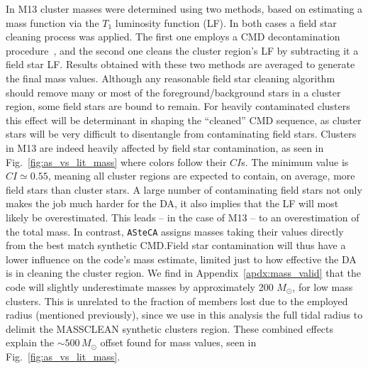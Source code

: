 \documentclass{aa}
\begin{document}
In M13 cluster masses were determined using two methods, based on estimating
a mass function via the $T_1$ luminosity function (LF).
In both cases a field star cleaning process was applied. The first one employs
a CMD decontamination procedure~\citep{Maia_2010}, and the
second one cleans the cluster region's LF by subtracting it a field star LF.\@
Results obtained with these two methods are averaged to generate the final
mass values.
%
Although any reasonable field star cleaning algorithm should remove many or most
of the foreground/background stars in a cluster region, some field stars are
bound to remain. For heavily contaminated clusters this effect will be
determinant in shaping the ``cleaned'' CMD sequence, as cluster stars will be
very difficult to disentangle from contaminating field stars.
%
Clusters in M13 are indeed heavily affected by field star contamination,
as seen in Fig.~\ref{fig:as_vs_lit_mass} where colors follow their $CI$s.
The minimum value is $CI{\simeq}0.55$, meaning all cluster regions are expected
to contain, on average, more field stars than cluster stars.
%
A large number of contaminating field stars not only makes the job much harder
for the DA, it also implies that the LF will most likely be overestimated. This
leads -- in the case of M13 --  to an overestimation of the total mass.
%
In contrast, \texttt{ASteCA} assigns masses taking their values directly from
the best match synthetic CMD.\@ Field star contamination will thus have a lower
influence on the code's mass estimate, limited just to how effective the DA is
in cleaning the cluster region.
%
We find in Appendix~\ref{apdx:mass_valid} that the code will slightly
underestimate masses by approximately 200 $M_{\odot}$, for low mass
clusters. This is unrelated to the fraction of members lost due
to the employed radius (mentioned previously), since we use in this analysis
the full tidal radius to delimit the MASSCLEAN synthetic clusters region.
These combined effects explain the ${\sim}500\,M_{\odot}$ offset found
for mass values, seen in Fig.~\ref{fig:as_vs_lit_mass}.
\end{document}
